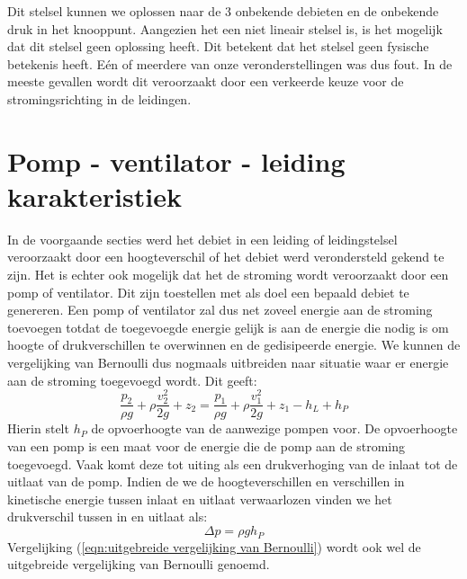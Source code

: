 Dit stelsel kunnen we oplossen naar de 3 onbekende debieten en de onbekende druk in het knooppunt. Aangezien het een niet lineair stelsel is, is het mogelijk dat dit stelsel geen oplossing heeft. Dit betekent dat het stelsel geen fysische betekenis heeft. Eén of meerdere van onze veronderstellingen was dus fout. In de meeste gevallen wordt dit veroorzaakt door een verkeerde keuze voor de stromingsrichting in de leidingen.

	\section{Pomp - ventilator - leiding karakteristiek}
	\label{sec:Pomp - ventilator - leiding karakteristiek}
In de voorgaande secties werd het debiet in een leiding of leidingstelsel veroorzaakt door een hoogteverschil of het debiet werd verondersteld gekend te zijn. Het is echter ook mogelijk dat het de stroming wordt veroorzaakt door een pomp of ventilator. Dit zijn toestellen met als doel een bepaald debiet te genereren. Een pomp of ventilator zal dus net zoveel energie aan de stroming toevoegen totdat de toegevoegde energie gelijk is aan de energie die nodig is om hoogte of drukverschillen te overwinnen en de gedisipeerde energie. We kunnen de vergelijking van Bernoulli dus nogmaals uitbreiden naar situatie waar er energie aan de stroming toegevoegd wordt. Dit geeft: 
\begin{equation}
	\frac{p_2}{\rho g} + \rho \frac{v_2^2}{2 g}  + z_2 = \frac{p_1}{\rho g} + \rho \frac{v_1^2}{2 g}  + z_1 - h_L + h_P
	\label{eqn:uitgebreide vergelijking van Bernoulli}
\end{equation}
Hierin stelt $h_P$ de opvoerhoogte van de aanwezige pompen voor. De opvoerhoogte van een pomp is een maat voor de energie die de pomp aan de stroming toegevoegd. Vaak komt deze tot uiting als een drukverhoging van de inlaat tot de uitlaat van de pomp. Indien de we de hoogteverschillen en verschillen in kinetische energie tussen inlaat en uitlaat verwaarlozen vinden we het drukverschil tussen in en uitlaat als:
\begin{equation}
	\Delta p = \rho g h_P
\end{equation}
Vergelijking (\ref{eqn:uitgebreide vergelijking van Bernoulli}) wordt ook wel de uitgebreide vergelijking van Bernoulli genoemd.

